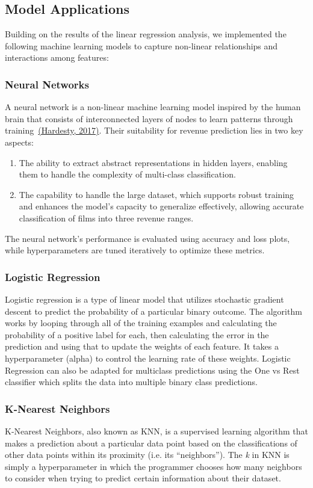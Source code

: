 \documentclass{article}
\begin{document}
\subsection{Model Applications}
Building on the results of the linear regression analysis, we implemented the following machine learning models to capture non-linear relationships and interactions among features:

\subsubsection{Neural Networks}
A neural network is a non-linear machine learning model inspired by the human brain that consists of interconnected layers of nodes to learn patterns through training~\hyperref[Hardesty2017]{(Hardesty, 2017)}. Their suitability for revenue prediction lies in two key aspects: 
\begin{enumerate}
    \item The ability to extract abstract representations in hidden layers, enabling them to handle the complexity of multi-class classification.
    \item The capability to handle the large dataset, which supports robust training and enhances the model's capacity to generalize effectively, allowing accurate classification of films into three revenue ranges.
    
\end{enumerate}
The neural network's performance is evaluated using accuracy and loss plots, while hyperparameters are tuned iteratively to optimize these metrics.
 
\subsubsection{Logistic Regression}
Logistic regression is a type of linear model that utilizes stochastic gradient descent to predict the probability of a particular binary outcome. The algorithm works by looping through all of the training examples and calculating the probability of a positive label for each, then calculating the error in the prediction and using that to update the weights of each feature. It takes a hyperparameter (alpha) to control the learning rate of these weights. Logistic Regression can also be adapted for multiclass predictions using the One vs Rest classifier which splits the data into multiple binary class predictions. 


\subsubsection{K-Nearest Neighbors}
K-Nearest Neighbors, also known as KNN, is a supervised learning algorithm that makes a prediction about a particular data point based on the classifications of other data points within its proximity (i.e. its “neighbors”). The \textit{k} in KNN is simply a hyperparameter in which the programmer chooses how many neighbors to consider when trying to predict certain information about their dataset. 
\end{document}
